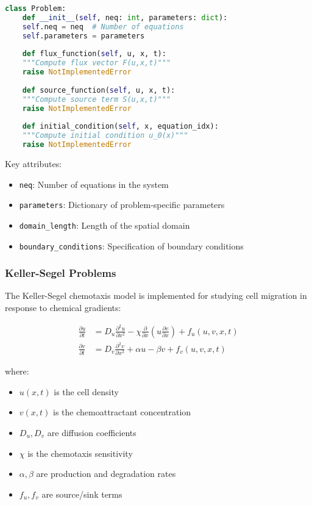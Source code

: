 \begin{lstlisting}[language=Python, caption=Base Problem Class Structure]
	class Problem:
	def __init__(self, neq: int, parameters: dict):
	self.neq = neq  # Number of equations
	self.parameters = parameters
	
	def flux_function(self, u, x, t):
	"""Compute flux vector F(u,x,t)"""
	raise NotImplementedError
	
	def source_function(self, u, x, t):
	"""Compute source term S(u,x,t)"""
	raise NotImplementedError
	
	def initial_condition(self, x, equation_idx):
	"""Compute initial condition u_0(x)"""
	raise NotImplementedError
\end{lstlisting}

Key attributes:
\begin{itemize}
	\item \texttt{neq}: Number of equations in the system
	\item \texttt{parameters}: Dictionary of problem-specific parameters
	\item \texttt{domain\_length}: Length of the spatial domain
	\item \texttt{boundary\_conditions}: Specification of boundary conditions
\end{itemize}

\subsubsection{Keller-Segel Problems}

The Keller-Segel chemotaxis model is implemented for studying cell migration in response to chemical gradients:

\begin{align}
	\frac{\partial u}{\partial t} &= D_u \frac{\partial^2 u}{\partial x^2} - \chi \frac{\partial}{\partial x}\left(u \frac{\partial v}{\partial x}\right) + f_u(u,v,x,t) \label{eq:ks_u} \\
	\frac{\partial v}{\partial t} &= D_v \frac{\partial^2 v}{\partial x^2} + \alpha u - \beta v + f_v(u,v,x,t) \label{eq:ks_v}
\end{align}

where:
\begin{itemize}
	\item $u(x,t)$ is the cell density
	\item $v(x,t)$ is the chemoattractant concentration  
	\item $D_u, D_v$ are diffusion coefficients
	\item $\chi$ is the chemotaxis sensitivity
	\item $\alpha, \beta$ are production and degradation rates
	\item $f_u, f_v$ are source/sink terms
\end{itemize}

